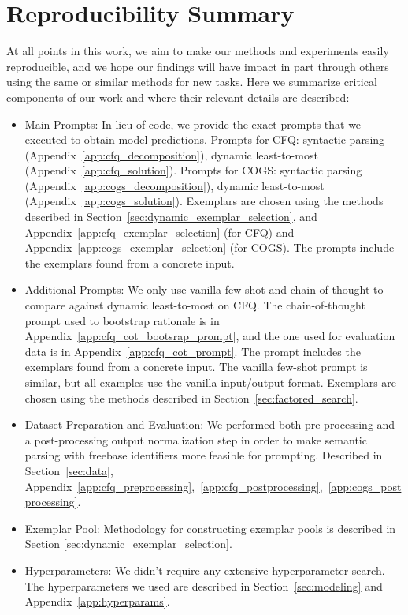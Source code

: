 \documentclass{article} \usepackage{iclr2022_conference,times}
\begin{document}
\section{Reproducibility Summary \label{app:reproduce}}

At all points in this work, we aim to make our methods and experiments easily reproducible, and we hope our findings will have impact in part through others using the same or similar methods for new tasks. Here we summarize critical components of our work and where their relevant details are described:

\begin{itemize}
    \item Main Prompts: In lieu of code, we provide the exact prompts that we executed to obtain model predictions. Prompts for CFQ: syntactic parsing (Appendix~\ref{app:cfq_decomposition}), dynamic least-to-most (Appendix~\ref{app:cfq_solution}). Prompts for COGS: syntactic parsing (Appendix~\ref{app:cogs_decomposition}), dynamic least-to-most (Appendix~\ref{app:cogs_solution}). Exemplars are chosen using the methods described in Section~\ref{sec:dynamic_exemplar_selection}, and Appendix~\ref{app:cfq_exemplar_selection} (for CFQ) and Appendix~\ref{app:cogs_exemplar_selection} (for COGS). The prompts include the exemplars found from a concrete input.
    \item Additional Prompts: We only use vanilla few-shot and chain-of-thought to compare against dynamic least-to-most on CFQ. The chain-of-thought prompt used to bootstrap rationale is in Appendix~\ref{app:cfq_cot_bootsrap_prompt}, and the one used for evaluation data is in Appendix~\ref{app:cfq_cot_prompt}. The prompt includes the exemplars found from a concrete input. The vanilla few-shot prompt is similar, but all examples use the vanilla input/output format. Exemplars are chosen using the methods described in Section~\ref{sec:factored_search}.
    \item Dataset Preparation and Evaluation: We performed both pre-processing and a post-processing output normalization step in order to make semantic parsing with freebase identifiers more feasible for prompting. Described in Section~\ref{sec:data}, Appendix~\ref{app:cfq_preprocessing},~\ref{app:cfq_postprocessing},~\ref{app:cogs_postprocessing}.
    \item Exemplar Pool: Methodology for constructing exemplar pools is described in Section \ref{sec:dynamic_exemplar_selection}.
    \item Hyperparameters: We didn't require any extensive hyperparameter search. The hyperparameters we used are described in Section~\ref{sec:modeling} and Appendix~\ref{app:hyperparams}.
\end{itemize}
\end{document}
